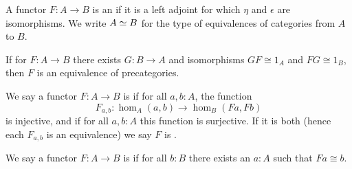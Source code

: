 \documentclass[hott-all.tex]{subfiles}
\begin{document}
\begin{defn}\label{ct:equiv}
  A functor $F:A\to B$ is an 
  if it is a left adjoint for which $\eta$ and $\epsilon$ are isomorphisms.
  We write $A \simeq B$ for the type of equivalences of categories from $A$ to $B$.
\end{defn}


\begin{lem}\label{ct:adjointification}
  If for $F:A\to B$ there exists $G:B\to A$ and isomorphisms $GF\cong 1_A$ and $FG\cong 1_B$, then $F$ is an equivalence of precategories.
\end{lem}

\begin{defn}\label{ct:full-faithful}
  We say a functor $F:A\to B$ is 
  if for all $a,b:A$, the function
  \[F_{a,b}:\hom_A(a,b) \to \hom_B(Fa,Fb)\]
  is injective, and 
  if for all $a,b:A$ this function is surjective.
  If it is both (hence each $F_{a,b}$ is an equivalence) we say $F$ is .
\end{defn}

\begin{defn}\label{ct:split-essentially-surjective}
  We say a functor $F:A\to B$ is 
  if for all $b:B$ there exists an $a:A$ such that $Fa\cong b$.
\end{defn}
\end{document}
